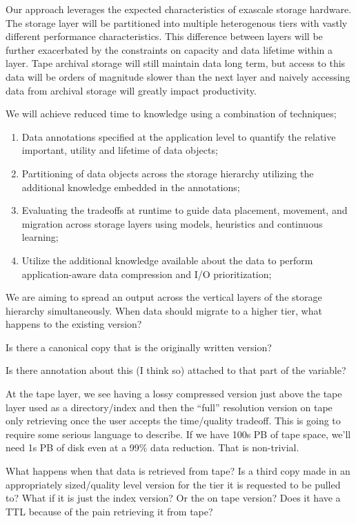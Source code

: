 Our approach leverages the expected characteristics of exascale storage
hardware. The storage layer will be partitioned into multiple heterogenous
tiers with vastly different performance characteristics. This difference
between layers will be further exacerbated by the constraints on capacity
and data lifetime within a layer. Tape archival storage will still maintain
data long term, but access to this data will be orders of magnitude slower
than the next layer and naively accessing data from archival storage will
greatly impact productivity.

We will achieve reduced time to knowledge using a combination of techniques;
\begin{enumerate}
\item Data annotations specified at the application level to quantify the
  relative important, utility and lifetime of data objects;
\item Partitioning of data objects across the storage hierarchy utilizing
  the additional knowledge embedded in the annotations;
\item Evaluating the tradeoffs at runtime to guide data placement, movement,
  and migration across storage layers using models, heuristics and
  continuous learning;
\item Utilize the additional knowledge available about the data to perform
  application-aware data compression and I/O prioritization;
\end{enumerate}

We are aiming to spread an output across the vertical layers of the storage
hierarchy simultaneously. When data should migrate to a higher tier, what
happens to the existing version?

Is there a canonical copy that is the originally written version?

Is there annotation about this (I think so) attached to that part of the
variable?

At the tape layer, we see having a lossy compressed version just above the
tape layer used as a directory/index and then the ``full'' resolution
version on tape only retrieving once the user accepts the time/quality
tradeoff. This is going to require some serious language to describe. If we
have 100s PB of tape space, we'll need 1s PB of disk even at a 99\% data
reduction. That is non-trivial.

What happens when that data is retrieved from tape? Is a third copy made in
an appropriately sized/quality level version for the tier it is requested to
be pulled to? What if it is just the index version? Or the on tape version?
Does it have a TTL because of the pain retrieving it from tape?

